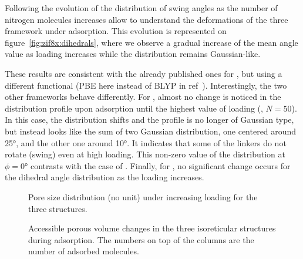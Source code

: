 \documentclass[thesis]{subfiles}
\begin{document}
Following the evolution of the distribution of swing angles as the number of
nitrogen molecules increases allow to understand the deformations of the three
framework under adsorption. This evolution is represented on
figure~\ref{fig:zif8x:dihedrals}, where we observe a gradual increase of the
mean angle value as loading increases while the distribution remains
Gaussian-like.

These results are consistent with the already published ones for
\cite{Coudert2017}, but using a different functional (PBE here instead of
BLYP in ref~\cite{Coudert2017}). Interestingly, the two other frameworks behave
differently. For \ZIFCl, almost no change is noticed in the distribution profile
upon adsorption until the highest value of loading (\ie, $N = 50$). In this
case, the distribution shifts and the profile is no longer of Gaussian type, but
instead looks like the sum of two Gaussian distribution, one centered around
25°, and the other one around 10°. It indicates that some of the linkers do not
rotate (swing) even at high loading. This non-zero value of the distribution at
$\phi = 0\text{°}$ contrasts with the case of . Finally, for \ZIFBr, no
significant change occurs for the dihedral angle distribution as the loading
increases.

\begin{figure}[t]
    \centering
    
    \caption{Pore size distribution (no unit) under increasing loading for the
    three structures.}
    \label{fig:zif8x:pores-sizes}
\end{figure}

\begin{figure}[b]
    \centering
    
    \caption{Accessible porous volume changes in the three isoreticular
    structures during adsorption. The numbers on top of the columns are the
    number of adsorbed  molecules.}
    \label{fig:zif8x:porous-volume}
\end{figure}
\end{document}
